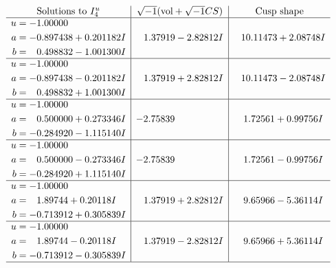 \documentclass[1p]{elsarticle_modified}
\theoremstyle{definition}
\newcommand{\I}{\sqrt{-1}}
\begin{document}
$$\begin{array}{c|c|c}  
\text{Solutions to }I^u_{4}& \I (\text{vol} + \sqrt{-1}CS) & \text{Cusp shape}\\
 \hline 
\begin{aligned}
u &= -1.00000\phantom{ +0.000000I} \\
a &= -0.897438 + 0.201182 I \\
b &= \phantom{-}0.498832 - 1.001300 I\end{aligned}
 & \phantom{-}1.37919 - 2.82812 I & \phantom{-}10.11473 + 2.08748 I \\ \hline\begin{aligned}
u &= -1.00000\phantom{ +0.000000I} \\
a &= -0.897438 - 0.201182 I \\
b &= \phantom{-}0.498832 + 1.001300 I\end{aligned}
 & \phantom{-}1.37919 + 2.82812 I & \phantom{-}10.11473 - 2.08748 I \\ \hline\begin{aligned}
u &= -1.00000\phantom{ +0.000000I} \\
a &= \phantom{-}0.500000 + 0.273346 I \\
b &= -0.284920 - 1.115140 I\end{aligned}
 & -2.75839\phantom{ +0.000000I} & \phantom{-}1.72561 + 0.99756 I \\ \hline\begin{aligned}
u &= -1.00000\phantom{ +0.000000I} \\
a &= \phantom{-}0.500000 - 0.273346 I \\
b &= -0.284920 + 1.115140 I\end{aligned}
 & -2.75839\phantom{ +0.000000I} & \phantom{-}1.72561 - 0.99756 I \\ \hline\begin{aligned}
u &= -1.00000\phantom{ +0.000000I} \\
a &= \phantom{-}1.89744 + 0.20118 I \\
b &= -0.713912 + 0.305839 I\end{aligned}
 & \phantom{-}1.37919 + 2.82812 I & \phantom{-}9.65966 - 5.36114 I \\ \hline\begin{aligned}
u &= -1.00000\phantom{ +0.000000I} \\
a &= \phantom{-}1.89744 - 0.20118 I \\
b &= -0.713912 - 0.305839 I\end{aligned}
 & \phantom{-}1.37919 - 2.82812 I & \phantom{-}9.65966 + 5.36114 I\\
 \hline 
 \end{array}$$\newpage
\end{document}
